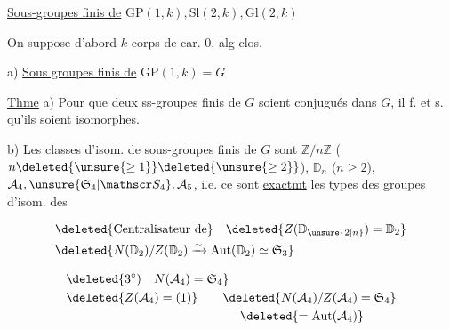 \uline{Sous-groupes finis de} $\mathrm{GP}(1,k),\mathrm{Sl}(2,k),\mathrm{Gl}(2,k)$

On suppose d'abord $k$ corps de car. 0, alg clos.

a) \uline{Sous groupes finis de} $\mathrm{GP}(1,k)=G$

\uline{Thme} a) Pour que deux ss-groupes finis  de $G$ soient conjugués
dans $G$, il f. et s. qu'ils soient isomorphes.

b) Les classes d'isom. de sous-groupes finis de $G$
sont  $\mathbb Z/n\mathbb Z$ ($n\deleted{\unsure{\geq1}}\deleted{\unsure{\geq2}}$), $\mathbb D_n$ ($n\geq2$), $\mathcal A_4,\unsure{\mathfrak S_4|\mathscr S_4},\mathcal A_5$, i.e.
ce sont \uline{exactmt} les types des groupes d'isom. des





\[
\begin{aligned}
&\deleted{\text{Centralisateur de}}\quad\deleted{Z(\mathbb D_{\unsure{2|n}})=\mathbb D_2}\\ 
&\deleted{N(\mathbb D_2)/Z(\mathbb D_2)\xrightarrow{\sim}\mathrm{Aut}(\mathbb D_2)\simeq\mathfrak S_3}
\end{aligned}
\]

\[
\begin{aligned}
&\deleted{3^\circ)\quad N(\mathcal A_4)=\mathfrak S_4}\\ 
&\deleted{Z(\mathcal A_4)=(1)}\qquad\deleted{N(\mathcal A_4)/Z(\mathcal A_4)=\mathfrak S_4}\\ 
&\hspace{14em}\deleted{=\mathrm{Aut}(\mathcal A_4)}
\end{aligned}
\]

